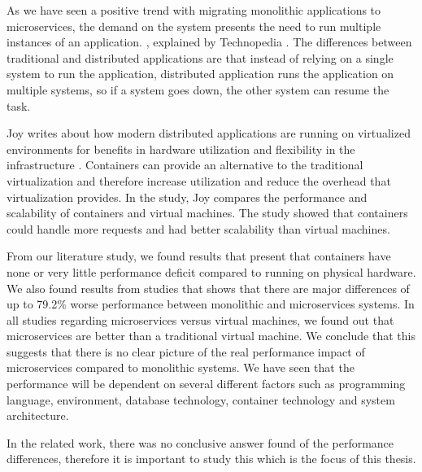 \documentclass[a4paper,oneside]{bth}
\begin{document}
As we have seen a positive trend with migrating monolithic applications to microservices, the demand on the system presents the need to run multiple instances of an application. , explained by Technopedia \cite{Technopedia}. The differences between traditional and distributed applications are that instead of relying on a single system to run the application, distributed application runs the application on multiple systems, so if a system goes down, the other system can resume the task.

\par\vspace {0.5cm}

Joy writes about how modern distributed applications are running on virtualized environments for benefits in hardware utilization and flexibility in the infrastructure \cite{Joy}. Containers can provide an alternative to the traditional virtualization and therefore increase utilization and reduce the overhead that virtualization provides. In the study, Joy compares the performance and scalability of containers and virtual machines. The study showed that containers could handle more requests and had better scalability than virtual machines.

\par\vspace {0.5cm}

From our literature study, we found results that present that containers have none or very little performance deficit compared to running on physical hardware. We also found results from studies that shows that there are major differences of up to 79.2\% worse performance between monolithic and microservices systems. In all studies regarding microservices versus virtual machines, we found out that microservices are better than a traditional virtual machine. We conclude that this suggests that there is no clear picture of the real performance impact of microservices compared to monolithic systems. We have seen that the performance will be dependent on several different factors such as programming language, environment, database technology, container technology and system architecture.

\par\vspace {0.5cm}
In the related work, there was no conclusive answer found of the performance differences, therefore it is important to study this which is the focus of this thesis.

\end{document}
